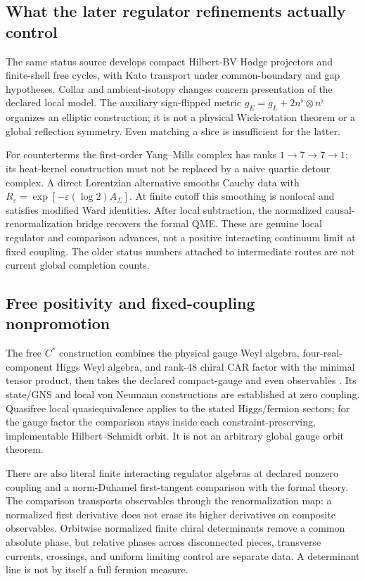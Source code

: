 \documentclass[11pt]{article}
\theoremstyle{definition}
\theoremstyle{remark}
\begin{document}
\subsection{What the later regulator refinements actually control}
\label{sec:status-refinements}
The same status source develops compact Hilbert-BV Hodge projectors and
finite-shell free cycles, with Kato transport under common-boundary and gap
hypotheses. Collar and ambient-isotopy changes concern presentation of the
declared local model. The auxiliary sign-flipped metric
\(g_E=g_L+2n^{\flat}\otimes n^{\flat}\) organizes an elliptic construction;
it is not a physical Wick-rotation theorem or a global reflection symmetry.
Even matching a slice is insufficient for the latter.

For counterterms the first-order Yang--Mills complex has ranks
\(1\to7\to7\to1\); its heat-kernel construction must not be replaced by a
naive quartic detour complex. A direct Lorentzian alternative smooths
Cauchy data with \(R_\varepsilon=\exp[-\varepsilon(\log2)A_\Sigma]\).
At finite cutoff this smoothing is nonlocal and satisfies modified Ward
identities. After local subtraction, the normalized causal-renormalization
bridge recovers the formal QME. These are genuine local regulator and
comparison advances, not a positive interacting continuum limit at fixed
coupling. The older status numbers attached to intermediate routes are not
current global completion counts.

\subsection{Free positivity and fixed-coupling nonpromotion}
\label{sec:free-cstar}
The free \(C^*\) construction combines the physical gauge Weyl algebra,
four-real-component Higgs Weyl algebra, and rank-48 chiral CAR factor with
the minimal tensor product, then takes the declared compact-gauge and even
observables \cite{FrozenCstar}. Its state/GNS and local von Neumann
constructions are established at zero coupling. Quasifree local
quasiequivalence applies to the stated Higgs/fermion sectors; for the gauge
factor the comparison stays inside each constraint-preserving,
implementable Hilbert--Schmidt orbit. It is not an arbitrary global gauge
orbit theorem.

There are also literal finite interacting regulator algebras at declared
nonzero coupling and a norm-Duhamel first-tangent comparison with the formal
theory. The comparison transports observables through the renormalization
map: a normalized first derivative does not erase its higher derivatives
on composite observables. Orbitwise normalized finite chiral determinants
remove a common absolute phase, but relative phases across disconnected
pieces, transverse currents, crossings, and uniform limiting control are
separate data. A determinant line is not by itself a full fermion measure.
\end{document}
